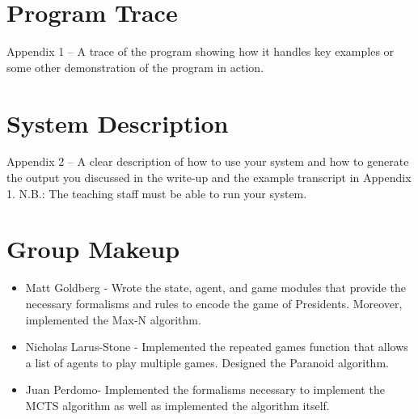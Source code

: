 \documentclass[11pt]{article}
\begin{document}
\appendix

\section{Program Trace}

Appendix 1 – A trace of the program showing how it handles key examples or some other demonstration of the program in action.

\section{System Description}

 Appendix 2 – A clear description of how to use your system and how to generate the output you discussed in the write-up and the example transcript in Appendix 1. N.B.: The teaching staff must be able to run your system.

\section{Group Makeup}

\begin{itemize}
\item Matt Goldberg - Wrote the state, agent, and game modules that provide the necessary formalisms and rules to encode the game of Presidents. Moreover, implemented the Max-N algorithm.
\item Nicholas Larus-Stone - Implemented the repeated games function that allows a list of agents to play multiple games. Designed the Paranoid algorithm.
\item Juan Perdomo-  Implemented the formalisms necessary to implement the MCTS algorithm as well as implemented the algorithm itself.
\end{itemize}
\end{document}
